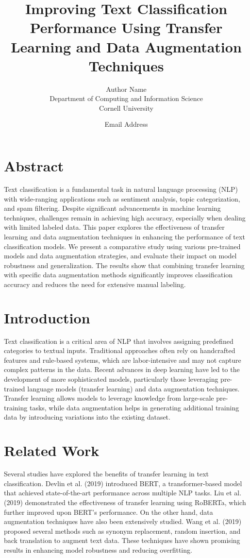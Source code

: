 \documentclass{article}
\title{Improving Text Classification Performance Using Transfer Learning and Data Augmentation Techniques}
\author{Author Name \\
Department of Computing and Information Science \\
Cornell University \\
\and Email Address \\}
\date{}
\begin{document}
\maketitle

\section{Abstract}
Text classification is a fundamental task in natural language processing (NLP) with wide-ranging applications such as sentiment analysis, topic categorization, and spam filtering. Despite significant advancements in machine learning techniques, challenges remain in achieving high accuracy, especially when dealing with limited labeled data. This paper explores the effectiveness of transfer learning and data augmentation techniques in enhancing the performance of text classification models. We present a comparative study using various pre-trained models and data augmentation strategies, and evaluate their impact on model robustness and generalization. The results show that combining transfer learning with specific data augmentation methods significantly improves classification accuracy and reduces the need for extensive manual labeling.

\section{Introduction}
Text classification is a critical area of NLP that involves assigning predefined categories to textual inputs. Traditional approaches often rely on handcrafted features and rule-based systems, which are labor-intensive and may not capture complex patterns in the data. Recent advances in deep learning have led to the development of more sophisticated models, particularly those leveraging pre-trained language models (transfer learning) and data augmentation techniques. Transfer learning allows models to leverage knowledge from large-scale pre-training tasks, while data augmentation helps in generating additional training data by introducing variations into the existing dataset.

\section{Related Work}
Several studies have explored the benefits of transfer learning in text classification. Devlin et al. (2019) introduced BERT, a transformer-based model that achieved state-of-the-art performance across multiple NLP tasks. Liu et al. (2019) demonstrated the effectiveness of transfer learning using RoBERTa, which further improved upon BERT’s performance. On the other hand, data augmentation techniques have also been extensively studied. Wang et al. (2019) proposed several methods such as synonym replacement, random insertion, and back translation to augment text data. These techniques have shown promising results in enhancing model robustness and reducing overfitting.
\end{document}
